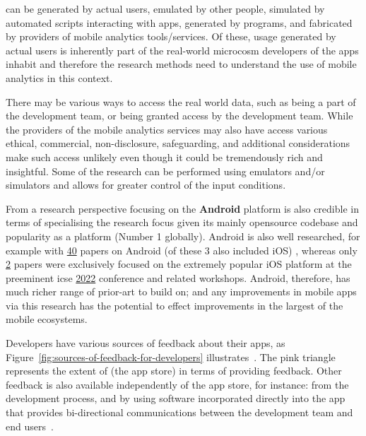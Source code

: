\begin{kaobox}[frametitle=Usage data]
 can be generated by actual users, emulated by other people, simulated by automated scripts interacting with apps, generated by programs, and fabricated by providers of mobile analytics tools/services. Of these, usage generated by actual users is inherently part of the real-world microcosm developers of the apps inhabit and therefore the research methods need to understand the use of mobile analytics in this context. 

There may be various ways to access the real world data, such as being a part of the development team, or being granted access by the development team. While the providers of the mobile analytics services may also have access various ethical, commercial, non-disclosure, safeguarding, and additional considerations make such access unlikely even though it could be tremendously rich and insightful. Some of the research can be performed using emulators and/or simulators and allows for greater control of the input conditions.
\end{kaobox}

From a research perspective focusing on the \textbf{Android} platform is also credible in terms of specialising the research focus given its mainly opensource codebase and popularity as a platform (Number 1 globally). Android is also well researched, for example with 
\href{https://conf.researchr.org/search/icse-2022/android/events}{40} papers on Android (of these 3 also included iOS) %
, whereas only \href{https://conf.researchr.org/search/icse-2022/ios/events}{2} %
papers were exclusively focused on the extremely popular iOS platform at the preeminent \gls{icse} \href{https://conf.resea
rchr.org/home/icse-2022}{2022} conference and related workshops. Android, therefore, has much richer range of prior-art to build on; and any improvements in mobile apps via this research has the potential to effect improvements in the largest of the mobile ecosystems.

Developers have various sources of feedback about their apps, as Figure~\ref{fig:sources-of-feedback-for-developers} illustrates~. The pink triangle represents the extent of  (the app store) in terms of providing feedback. Other feedback is also available independently of the app store, for instance: from the development process, and by using software incorporated directly into the app that provides bi-directional communications between the development team and end users~.

